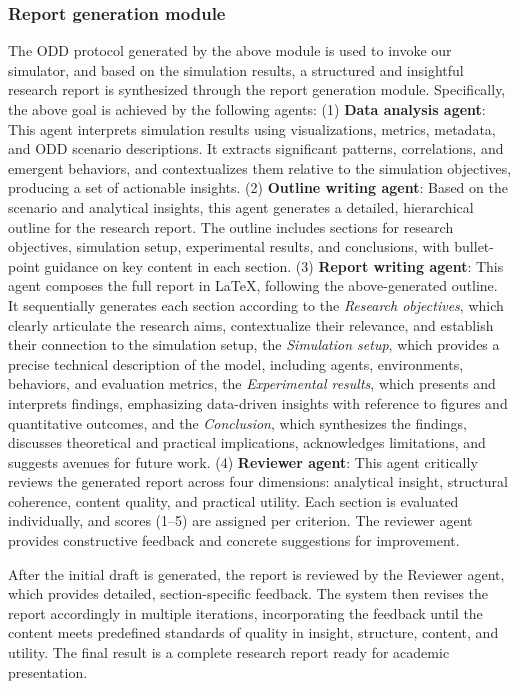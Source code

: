 \documentclass{article}
\theoremstyle{definition}
\theoremstyle{theorem}
\theoremstyle{proof}
\theoremstyle{remark}
\begin{document}
    \subsubsection{Report generation module}
    The ODD protocol generated by the above module is used to invoke our simulator, and based on the simulation results, a structured and insightful research report is synthesized through the report generation module.
    Specifically, the above goal is achieved by the following agents:
    (1) \textbf{Data analysis agent}: This agent interprets simulation results using visualizations, metrics, metadata, and ODD scenario descriptions. It extracts significant patterns, correlations, and emergent behaviors, and contextualizes them relative to the simulation objectives, producing a set of actionable insights.
    (2) \textbf{Outline writing agent}: Based on the scenario and analytical insights, this agent generates a detailed, hierarchical outline for the research report. 
    The outline includes sections for research objectives, simulation setup, experimental results, and conclusions, with bullet-point guidance on key content in each section.
    (3) \textbf{Report writing agent}: This agent composes the full report in LaTeX, following the above-generated outline. It sequentially generates each section according to the \textit{Research objectives}, which clearly articulate the research aims, contextualize their relevance, and establish their connection to the simulation setup, the \textit{Simulation setup}, which provides a precise technical description of the model, including agents, environments, behaviors, and evaluation metrics, the \textit{Experimental results}, which presents and interprets findings, emphasizing data-driven insights with reference to figures and quantitative outcomes, and the \textit{Conclusion}, which synthesizes the findings, discusses theoretical and practical implications, acknowledges limitations, and suggests avenues for future work.
    (4) \textbf{Reviewer agent}: This agent critically reviews the generated report across four dimensions: analytical insight, structural coherence, content quality, and practical utility. Each section is evaluated individually, and scores (1--5) are assigned per criterion. The reviewer agent provides constructive feedback and concrete suggestions for improvement.

    After the initial draft is generated, the report is reviewed by the Reviewer agent, which provides detailed, section-specific feedback. The system then revises the report accordingly in multiple iterations, incorporating the feedback until the content meets predefined standards of quality in insight, structure, content, and utility. The final result is a complete research report ready for academic presentation.
\end{document}
